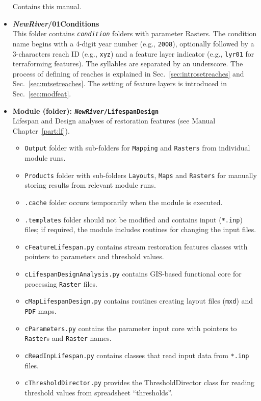 \begin{itemize}
	Contains this manual.
	\item \textbf{\textit{NewRiver}/01{\myUnderscore}Conditions}\\
	This folder contains \texttt{\textit{condition}} folders with parameter Rasters. The condition name begins with a 4-digit year number (e.g., \texttt{2008}), optionally followed by a 3-characters reach ID (e.g., \texttt{xyz}) and a feature layer indicator (e.g., \texttt{lyr01} for terraforming features). The syllables are separated by an underscore. The process of defining of reaches is explained in Sec.~\ref{sec:introsetreaches} and Sec.~\ref{sec:mtsetreaches}. The setting of feature layers is introduced in Sec.~\ref{sec:modfeat}.
	\item \textbf{Module (folder): \texttt{\textit{NewRiver}/LifespanDesign}}\\
	Lifespan and Design analyses of restoration features (see Manual Chapter~\ref{part:lf}).
	\begin{itemize}
		\item \texttt{Output} folder with sub-folders for \texttt{Mapping} and \texttt{Rasters} from individual module runs.
		\item \texttt{Products} folder with sub-folders \texttt{Layouts}, \texttt{Maps} and \texttt{Rasters} for manually storing results from relevant module runs.
		\item \texttt{.cache} folder occurs temporarily when the module is executed.
		\item \texttt{.templates} folder should not be modified and contains input (\texttt{*.inp}) files; if required, the module includes routines for changing the input files.
		\item \texttt{cFeatureLifespan.py} contains stream restoration features classes with pointers to parameters and threshold values.
		\item \texttt{cLifespanDesignAnalysis.py} contains GIS-based functional core for processing \texttt{Raster} files.
		\item \texttt{cMapLifespanDesign.py} contains routines creating layout files (\texttt{mxd}) and \texttt{PDF} maps.
		\item \texttt{cParameters.py} contains the parameter input core with pointers to \texttt{Raster}s and \texttt{Raster} names.
		\item \texttt{cReadInpLifespan.py} contains classes that read input data from \texttt{*.inp} files.
		\item \texttt{cThresholdDirector.py} provides the ThresholdDirector class for reading threshold values from spreadsheet ``thresholds''.

\end{itemize}
\end{itemize}
